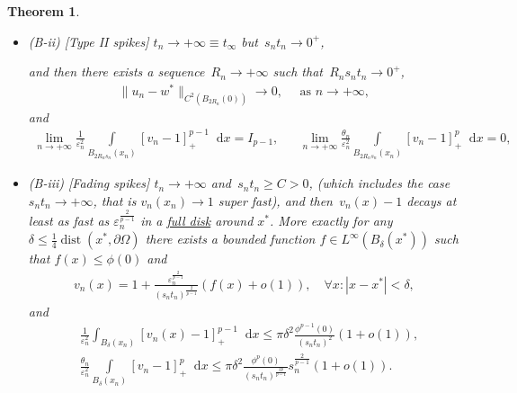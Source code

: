 \documentclass[10pt]{amsart}
\newcommand{\dd}{\mathop{}\!\mathrm{d}}
\newcommand{\eps}{\varepsilon}
\DeclareMathOperator{\dist}{dist}
\renewcommand{\to}{\rightarrow}
\newcommand{\un}[1]{\underline{#1}}
\newcommand{\ii}{\infty}
\newcommand{\dt}{\delta}
\newtheorem{theorem}{Theorem}[section]
\begin{document}
\begin{theorem}
\begin{itemize}
\begin{itemize}
                \item[or$\quad$] {\rm (B-ii) [Type II spikes]} $t_n\to+\infty\equiv t_\infty$ but~$s_n t_n\to 0^+$,

                and then there exists a sequence~$R_n\to +\infty$ such that~$R_n s_n t_n\to 0^+$,
                 \begin{align*}
                        \|u_n - w^*\|_{C^2(B_{2R_n}(0))}\to 0, \quad \mbox{ as } n\to+\infty,
                    \end{align*} and
                    \begin{align*}
                        \lim_{n\to+\infty} \frac{1}{\eps_n^2}\int\limits_{B_{2R_n s_n}(x_n)} [v_n-1]_+^{p-1}\dd{x}=I_{p-1}, & &
                        \lim_{n\to+\infty} \frac{\theta_n}{\eps_n^2}\int\limits_{B_{2R_n s_n}(x_n)} [v_n-1]_+^{p}\dd{x}=0,
                    \end{align*}

                \item[or$\quad$] {\rm (B-iii) [Fading spikes]} $t_n\to +\infty$ and~$s_n t_n \geq C>0$, \mbox{\rm (}which includes the case
                $s_n t_n \to+\infty$, that is $v_n(x_n)\to 1$ super fast\mbox{\rm )},
                and then~$v_n(x)-1$ decays at least as fast as $\eps_n^{\frac{2}{p-1}}$ in a \un{full disk} around $x^*$.
                More exactly for any $\dt\leq \frac{1}{4}\dist(x^*,\partial\Omega)$ there exists a bounded function $f\in L^{\ii}(B_\dt(x^*))$ such that
                $f(x)\leq \phi(0)$ and
                \begin{align*}
                    v_n(x)= 1+ \frac{\eps_n^{\frac{2}{p-1}}}{(s_n t_n)^{\frac{2}{p-1}}}(f(x)+o(1)), \quad \forall x \colon |x-x^*|<\dt,
                \end{align*}
and
                \begin{align}\nonumber
                        &\frac{1}{\eps_n^2}\int_{B_\dt(x_n)} [v_n(x)-1]_+^{p-1} \dd{x}\leq \pi \dt^2\frac{\phi^{p-1}(0)}{(s_n t_n)^{2}}(1+o(1)) , \\
                        \label{eq:Fading energies}
                        &\frac{\theta_n}{\eps_n^2}\int\limits_{B_{\dt}(x_n)} [v_n-1]_+^{p}\dd{x}\leq
                        \pi \dt^2 \frac{\phi^{p}(0)}{(s_n t_n)^{\frac{2p}{p-1}}} s_n^{\frac{2}{p-1}}(1+o(1)).
                    \end{align}
            \end{itemize}
        \end{itemize}
    \end{theorem}
\end{document}
